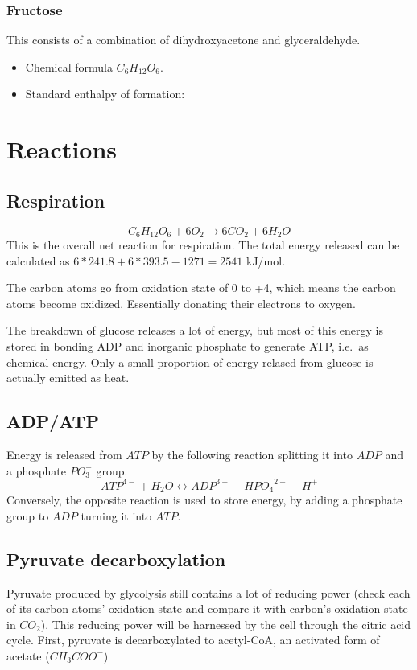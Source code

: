 \documentclass{article}
\begin{document}
\subsubsection{Fructose}
This consists of a combination of dihydroxyacetone and glyceraldehyde.

\begin{itemize}
    \item Chemical formula $C_6H_{12}O_6$.
    \item Standard enthalpy of formation:
\end{itemize}



\pagebreak
\section{Reactions}\label{sec_reactions}

\subsection{Respiration}
\[
    C_6H_{12}O_6 + 6O_2 \rightarrow 6CO_2 + 6H_2O
\]
This is the overall net reaction for respiration. The total energy released can be calculated as
$6*241.8 + 6*393.5 - 1271 = 2541$ kJ/mol.

The carbon atoms go from oxidation state of 0 to +4, which means the carbon atoms become
oxidized. Essentially donating their electrons to oxygen.

The breakdown of glucose releases a lot of energy, but most of this energy is stored in
bonding ADP and inorganic phosphate to generate ATP, i.e.\ as chemical energy. Only a
small proportion of energy relased from glucose is actually emitted as heat.

\subsection{ADP/ATP}
Energy is released from $ATP$ by the following reaction splitting it into $ADP$ and a
phosphate $PO_3^-$ group.
\[
    {ATP}^{4-} + H_2O \leftrightarrow {ADP}^{3-} + {HPO_4}^{2-} + H^+
\]
Conversely, the opposite reaction is used to store energy, by adding a phosphate group to
$ADP$ turning it into $ATP$.

\subsection{Pyruvate decarboxylation}
Pyruvate produced by glycolysis still contains a lot of reducing power (check each of its
carbon atoms' oxidation state and compare it with carbon's oxidation state in $CO_2$). This
reducing power will be harnessed by the cell through the citric acid cycle. First,
pyruvate is decarboxylated to acetyl-CoA, an activated form of acetate ($CH_3COO^-$)
\end{document}
